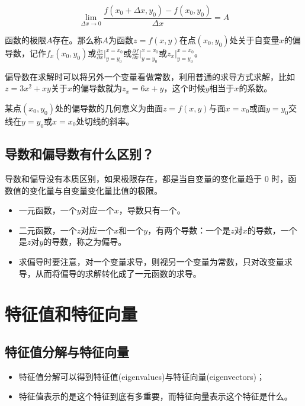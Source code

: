 \begin{itemize}
		$$
		\lim_{\Delta x \to 0}{\frac{f(x_0+\Delta x,y_0)-f(x_0,y_0)}{\Delta x}}=A
		$$

		函数的极限$A$存在。那么称$A$为函数$z=f(x,y)$在点$(x_0,y_0)$处关于自变量$x$的偏导数，记作$f_x(x_0,y_0)$或$\frac{\partial z}{\partial x}\vert_{y=y_0}^{x=x_0}$或$\frac{\partial f}{\partial x}\vert_{y=y_0}^{x=x_0}$或$z_x\vert_{y=y_0}^{x=x_0}$。

		偏导数在求解时可以将另外一个变量看做常数，利用普通的求导方式求解，比如$z=3x^2+xy$关于$x$的偏导数就为$z_x=6x+y$，这个时候$y$相当于$x$的系数。

		某点$(x_0,y_0)$处的偏导数的几何意义为曲面$z=f(x,y)$与面$x=x_0$或面$y=y_0$交线在$y=y_0$或$x=x_0$处切线的斜率。  
\end{itemize}

\subsection{导数和偏导数有什么区别？}

导数和偏导没有本质区别，如果极限存在，都是当自变量的变化量趋于 0 时，函数值的变化量与自变量变化量比值的极限。  

\begin{itemize}\itemsep0em
		\item 一元函数，一个$y$对应一个$x$，导数只有一个。  
		\item 二元函数，一个$z$对应一个$x$和一个$y$，有两个导数：一个是$z$对$x$的导数，一个是$z$对$y$的导数，称之为偏导。  
		\item 求偏导时要注意，对一个变量求导，则视另一个变量为常数，只对改变量求导，从而将偏导的求解转化成了一元函数的求导。
\end{itemize}


\section{特征值和特征向量}

\subsection{特征值分解与特征向量}

\begin{itemize}\itemsep0em
		\item 特征值分解可以得到特征值(eigenvalues)与特征向量(eigenvectors)；
		\item 特征值表示的是这个特征到底有多重要，而特征向量表示这个特征是什么。  
\end{itemize}

